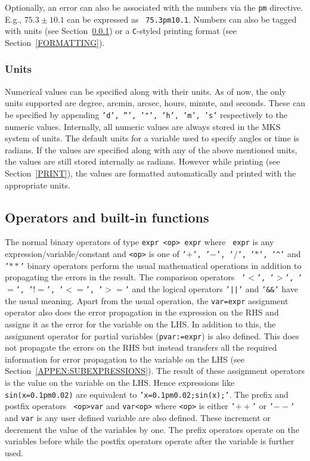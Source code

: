 \documentclass[acmtoms,acmnow]{acmtrans2m}
\begin{document}
Optionally, an error can also be associated with the numbers via the
{\tt pm} directive.  E.g., $75.3\pm 10.1$ can be expressed as {\tt
75.3pm10.1}.  Numbers can also be tagged with units (see
Section~\ref{UNITS}) or a {\tt C}-styled printing format (see
Section~\ref{FORMATTING}).

\subsubsection{Units}
\label{UNITS}
   
Numerical values can be specified along with their units.  As of now,
the only units supported are degree, arcmin, arcsec, hours, minute,
and seconds.  These can be specified by appending {\tt 'd', ''', '"',
'h', 'm', 's'} respectively to the numeric values.  Internally, all
numeric values are always stored in the MKS system of units.  The
default units for a variable used to specify angles or time is
radians.  If the values are specified along with any of the above
mentioned units, the values are still stored internally as radians.
However while printing (see Section~\ref{PRINT}), the values are
formatted automatically and printed with the appropriate units.

\subsection{Operators and built-in functions}

The normal binary operators of type {\tt expr <op> expr} where {\tt
  expr} is any expression/variable/constant and {\tt <op>} is one of
{\tt '$+$', '$-$', '$/$', '$*$', '\^{}'} and {\tt '$**$'} binary
operators perform the usual mathematical operations in addition to
propagating the errors in the result.  The comparison operators {\tt
  '$<$', '$>$', '$=$', '$!=$', '$<=$', '$>=$'} and the logical
operators {\tt '||'} and {\tt '\&\&'} have the usual meaning.  Apart
from the usual operation, the {\tt var=expr} assignment operator also
does the error propagation in the expression on the RHS and assigns it
as the error for the variable on the LHS.  In addition to this, the
assignment operator for partial variables ({\tt pvar:=expr}) is also
defined.  This does not propagate the errors on the RHS but instead
transfers all the required information for error propagation to the
variable on the LHS (see Section~\ref{APPEN:SUBEXPRESSIONS}).  The
result of these assignment operators is the value on the variable on
the LHS.  Hence expressions like {\tt sin(x=0.1pm0.02)} are equivalent
to {\tt 'x=0.1pm0.02;sin(x);'}.  The prefix and postfix operators {\tt
  <op>var} and {\tt var<op>} where {\tt <op>} is either {\tt '$++$'}
or {\tt '$--$'} and {\tt var} is any user defined variable are also
defined.  These increment or decrement the value of the variables by
one.  The prefix operators operate on the variables before while the
postfix operators operate after the variable is further used.
\end{document}
